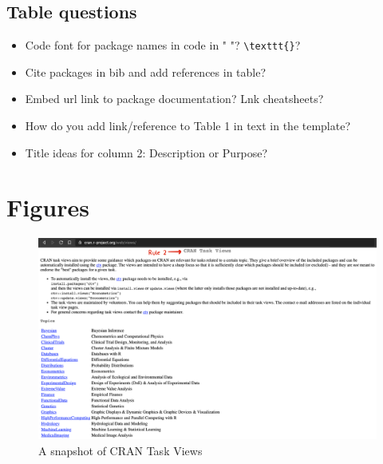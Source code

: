 \documentclass[10pt,letterpaper]{article}
\providecommand{\tightlist}{%
  \setlength{\itemsep}{0pt}\setlength{\parskip}{0pt}}
\begin{document}
\hypertarget{table-questions}{%
\subsection{Table questions}\label{table-questions}}

\begin{itemize}
\tightlist
\item
  Code font for package names in code in " "?
  \texttt{\textbackslash{}texttt\{\}}?
\item
  Cite packages in bib and add references in table?
\item
  Embed url link to package documentation? Lnk cheatsheets?
\item
  How do you add link/reference to Table 1 in text in the template?
\item
  Title ideas for column 2: Description or Purpose?
\end{itemize}

\hypertarget{figures}{%
\section{Figures}\label{figures}}

\begin{figure}
\includegraphics[width=1\linewidth]{../figures/cran_task_views} \caption{A snapshot of CRAN Task Views}\label{fig:cran_task_views}
\end{figure}
\end{document}
